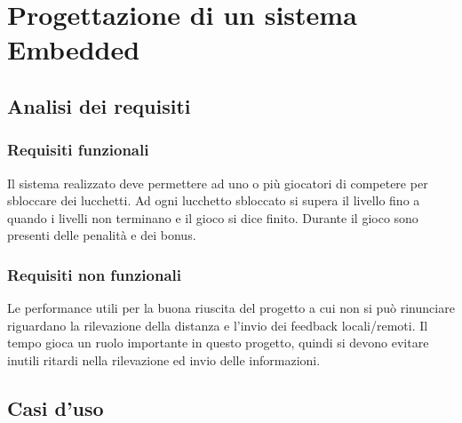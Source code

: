 \chapter{Progettazione di un sistema Embedded}
\section{Analisi dei requisiti}
\subsection{Requisiti funzionali}
Il sistema realizzato deve permettere ad uno o più giocatori di competere per sbloccare dei lucchetti. Ad ogni lucchetto sbloccato si supera il livello fino a quando i livelli non terminano e il gioco si dice finito. Durante il gioco sono presenti delle penalità e dei bonus.

\subsection{Requisiti non funzionali}
Le performance utili per la buona riuscita del progetto a cui non si può rinunciare riguardano la rilevazione della distanza e l'invio dei feedback locali/remoti.
Il tempo gioca un ruolo importante in questo progetto, quindi si devono evitare inutili ritardi nella rilevazione ed invio delle informazioni.

\newpage
\section{Casi d'uso}
